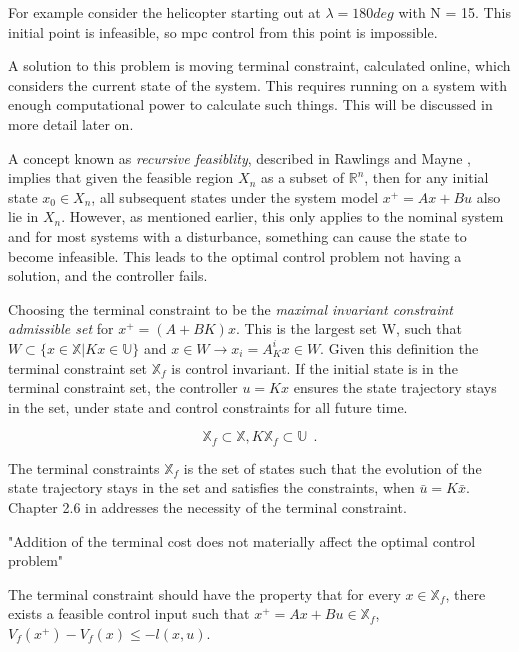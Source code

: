 For example consider the helicopter starting out at $\lambda = 180 deg$ with N = 15. This initial point is infeasible, so \acrshort{mpc} control from this point is impossible.

A solution to this problem is moving terminal constraint, calculated online, which considers the current state of the system. This requires running on a system with enough computational power to calculate such things. This will be discussed in more detail later on. 


A concept known as \textit{recursive feasiblity}, described in Rawlings and Mayne \cite{Rawlings&Mayne}, implies that given the feasible region $X_n$ as a subset of $\mathbb{R}^n$, then for any initial state $x_0 \in X_n$, all subsequent states under the system model $x^+ = Ax + Bu$ also lie in $X_n$. However, as mentioned earlier, this only applies to the nominal system and for most systems with a disturbance, something can cause the state to become infeasible. This leads to the optimal control problem not having a solution, and the controller fails.

Choosing the terminal constraint to be the \textit{maximal invariant constraint admissible set} for $x^+ = (A + BK) x.$ This is the largest set W, such that $W \subset \{ x \in \mathbb{X} | Kx \in \mathbb{U} \}$ and $x \in W \rightarrow x_i = A_K^i x \in W$. Given this definition the terminal constraint set $\mathbb{X}_f$ is control invariant. If the initial state is in the terminal constraint set, the controller $u = Kx$ ensures the state trajectory stays in the set, under state and control constraints for all future time. 


\begin{equation}
    \mathbb{X}_f \subset \mathbb{X}, K \mathbb{X}_f \subset \mathbb{U} \: \: .
\end{equation}


The terminal constraints $\mathbb{X}_f$ is the set of states such that the evolution of the state trajectory stays in the set and satisfies the constraints, when $\bar{u} = K \bar{x}$. Chapter 2.6 in \cite{Rawlings&Mayne} addresses the necessity of the terminal constraint. 

"Addition of the terminal cost does not materially affect the optimal control problem"

The terminal constraint should have the property that for every $x \in \mathbb{X}_f$, there exists a feasible control input such that $x^+ = Ax + Bu \in \mathbb{X}_f$, $V_f(x^+) - V_f(x) \leq -l(x,u)$.


